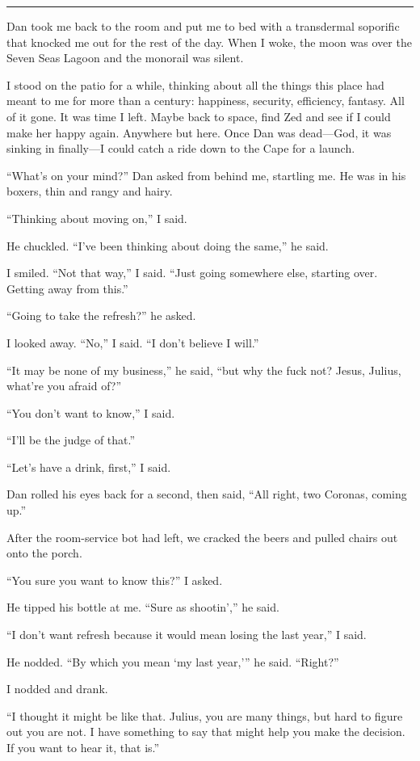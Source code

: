 \begin{center}\rule{3in}{0.4pt}\end{center}

Dan took me back to the room and put me to bed with a transdermal
soporific that knocked me out for the rest of the day. When I woke,
the moon was over the Seven Seas Lagoon and the monorail was
silent.

I stood on the patio for a while, thinking about all the things
this place had meant to me for more than a century: happiness,
security, efficiency, fantasy. All of it gone. It was time I left.
Maybe back to space, find Zed and see if I could make her happy
again. Anywhere but here. Once Dan was dead—God, it was sinking in
finally—I could catch a ride down to the Cape for a launch.

“What's on your mind?” Dan asked from behind me, startling me. He
was in his boxers, thin and rangy and hairy.

“Thinking about moving on,” I said.

He chuckled. “I've been thinking about doing the same,” he said.

I smiled. “Not that way,” I said. “Just going somewhere else,
starting over. Getting away from this.”

“Going to take the refresh?” he asked.

I looked away. “No,” I said. “I don't believe I will.”

“It may be none of my business,” he said, “but why the fuck not?
Jesus, Julius, what're you afraid of?”

“You don't want to know,” I said.

“I'll be the judge of that.”

“Let's have a drink, first,” I said.

Dan rolled his eyes back for a second, then said, “All right, two
Coronas, coming up.”

After the room-service bot had left, we cracked the beers and
pulled chairs out onto the porch.

“You sure you want to know this?” I asked.

He tipped his bottle at me. “Sure as shootin',” he said.

“I don't want refresh because it would mean losing the last year,”
I said.

He nodded. “By which you mean ‘my last year,’” he said. “Right?”

I nodded and drank.

“I thought it might be like that. Julius, you are many things, but
hard to figure out you are not. I have something to say that might
help you make the decision. If you want to hear it, that is.”

